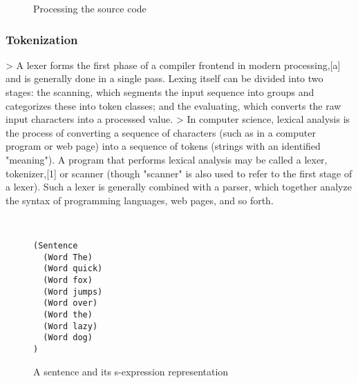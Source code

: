 \begin{figure}[!ht]
	\centering
	 {
	}
	\caption{Processing the source code}
	\label{fig:processing-the-source-code}
\end{figure}

\subsubsection{Tokenization}
> A lexer forms the first phase of a compiler frontend in modern processing,[a] and is generally done in a single pass. Lexing itself can be divided into two stages: the scanning, which segments the input sequence into groups and categorizes these into token classes; and the evaluating, which converts the raw input characters into a processed value.
> In computer science, lexical analysis is the process of converting a sequence of characters (such as in a computer program or web page) into a sequence of tokens (strings with an identified "meaning"). A program that performs lexical analysis may be called a lexer, tokenizer,[1] or scanner (though "scanner" is also used to refer to the first stage of a lexer). Such a lexer is generally combined with a parser, which together analyze the syntax of programming languages, web pages, and so forth.


\begin{figure}[!htb]
\centering
{}\\[1em]

\begin{minipage}{3cm}
\begin{verbatim}
(Sentence
  (Word The)
  (Word quick)
  (Word fox)
  (Word jumps)
  (Word over)
  (Word the)
  (Word lazy)
  (Word dog)
)
\end{verbatim}
\end{minipage}
  \caption{A sentence and its s-expression representation}
  \label{fig:sentence-s-expression}
\end{figure}
\FloatBarrier

